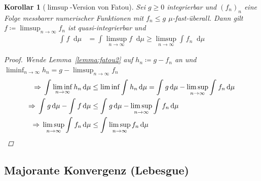 \documentclass[11pt, twoside, a4paper]{article}
\theoremstyle{plain}
\newtheorem{korollar}[blockelement]{Korollar}
\numberwithin{equation}{subsection}
\newcommand{\impl}[0]{\Rightarrow{}}
\newcommand{\dif}{\mathop{}\!\mathrm{d}}
\newcommand{\toinf}{\to\infty}
\begin{document}
    \begin{korollar}[$\limsup$-Version von Fatou] %
        \label{korollar:fatou3}
        Sei $g\geq 0$ integrierbar und $(f_n)_n$ eine Folge messbarer numerischer Funktionen mit $f_n \leq g$ $\mu$-fast-überall. Dann gilt $f \coloneqq \limsup_{n\toinf} f_n$ ist quasi-integrierbar und
        \begin{align*}
            \int_{}^{} f \dif \mu &= \int_{}^{} \limsup_{n\toinf} f \dif \mu \geq \limsup_{n\toinf} \int_{}^{} f_n \dif \mu
        \end{align*}

        \begin{proof}
            Wende Lemma~\ref{lemma:fatou2} auf $h_n \coloneqq g - f_n$ an und $\liminf_{n\toinf} h_n = g - \limsup_{n\toinf} f_n$
            \begin{align*}
                \impl \int_{}^{} \liminf_{n\toinf} h_n \dif \mu &\leq \liminf \int_{}^{} h_n \dif \mu = \int_{}^{} g \dif \mu - \limsup_{n\toinf} \int_{}^{} f_n \dif \mu\\
                \impl \int_{}^{} g \dif \mu - \int_{}^{} f \dif \mu &\leq \int_{}^{} g \dif \mu - \limsup_{n\toinf} \int_{}^{} f_n \dif \mu\\
                \impl \limsup_{n\toinf} \int_{}^{} f_n \dif \mu &\leq \int_{}^{} \limsup_{n\toinf} f_n \dif \mu\qedhere
            \end{align*}
        \end{proof}
    \end{korollar}

    \subsection{Majorante Konvergenz (Lebesgue)}
\end{document}
